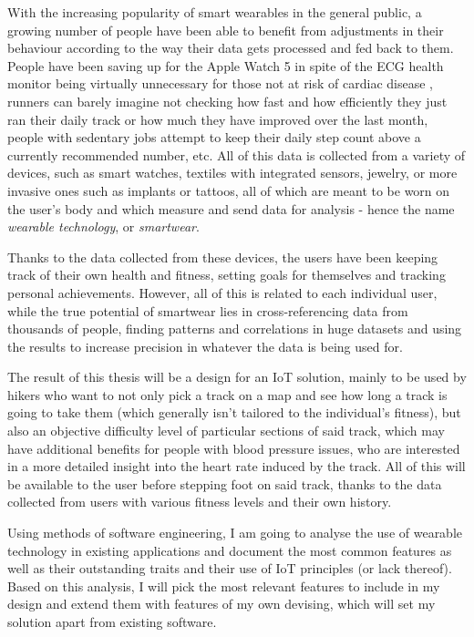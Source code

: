 \linebreak
With the increasing popularity of smart wearables in the general public, a growing number of people have been able to benefit from adjustments in their behaviour according to the way their data gets processed and fed back to them.
People have been saving up for the Apple Watch 5 \cite{AppleWatch5} in spite of the ECG health monitor being virtually unnecessary for those not at risk of cardiac disease \cite{ecg-screening},
runners can barely imagine not checking how fast and how efficiently they just ran their daily track or how much they have improved over the last month,
people with sedentary jobs attempt to keep their daily step count above a currently recommended number, etc.
All of this data is collected from a variety of devices, such as smart watches, textiles with integrated sensors, jewelry, or more invasive ones such as implants or tattoos, all of which are meant to be worn on the user's body and which measure and send data for analysis - hence the name \textit{wearable technology}, or \textit{smartwear}.\cite{what-is-wearable-tech}

Thanks to the data collected from these devices, the users have been keeping track of their own health and fitness, setting goals for themselves and tracking personal achievements.
However, all of this is related to each individual user, while the true potential of smartwear lies in cross-referencing data from thousands of people, finding patterns and correlations in huge datasets and using the results to increase precision in whatever the data is being used for. 

The result of this thesis will be a design for an IoT solution, mainly to be used by hikers who want to not only pick a track on a map and see how long a track is going to take them (which generally isn't tailored to the individual's fitness),
but also an objective difficulty level of particular sections of said track, which may have additional benefits for people with blood pressure issues, who are interested in a more detailed insight into the heart rate induced by the track.
All of this will be available to the user before stepping foot on said track, thanks to the data collected from users with various fitness levels and their own history.

Using methods of software engineering, I am going to analyse the use of wearable technology in existing applications and document the most common features as well as their outstanding traits and their use of IoT principles (or lack thereof).
Based on this analysis, I will pick the most relevant features to include in my design and extend them with features of my own devising, which will set my solution apart from existing software.

